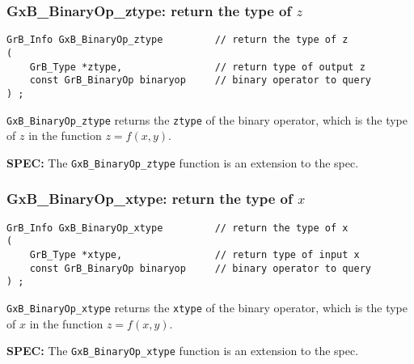 \documentclass[12pt]{article}
\begin{document}
\subsubsection{{\sf GxB\_BinaryOp\_ztype:} return the type of $z$} 
\label{binaryop_ztype}

\begin{mdframed}[userdefinedwidth=6in]
{\footnotesize
\begin{verbatim}
GrB_Info GxB_BinaryOp_ztype         // return the type of z
(
    GrB_Type *ztype,                // return type of output z
    const GrB_BinaryOp binaryop     // binary operator to query
) ;
\end{verbatim}
} \end{mdframed}

\verb'GxB_BinaryOp_ztype'
returns the \verb'ztype' of the binary operator, which is the
type of $z$ in the function $z=f(x,y)$.

\begin{spec}
{\bf SPEC:} The \verb'GxB_BinaryOp_ztype' function is an extension to the spec.
\end{spec}

\subsubsection{{\sf GxB\_BinaryOp\_xtype:} return the type of $x$} 
\label{binaryop_xtype}

\begin{mdframed}[userdefinedwidth=6in]
{\footnotesize
\begin{verbatim}
GrB_Info GxB_BinaryOp_xtype         // return the type of x
(
    GrB_Type *xtype,                // return type of input x
    const GrB_BinaryOp binaryop     // binary operator to query
) ;
\end{verbatim}
}\end{mdframed}

\verb'GxB_BinaryOp_xtype'
returns the \verb'xtype' of the binary operator, which is the
type of $x$ in the function $z=f(x,y)$.

\begin{spec}
{\bf SPEC:} The \verb'GxB_BinaryOp_xtype' function is an extension to the spec.
\end{spec}
\end{document}
